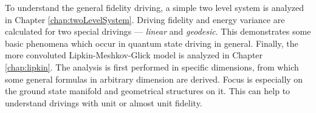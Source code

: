 To understand the general fidelity driving, a simple two level system is analyzed in Chapter \ref{chap:twoLevelSystem}. Driving fidelity and energy variance are calculated for two special drivings — \emph{linear} and \emph{geodesic}. This demonstrates some basic phenomena which occur in quantum state driving in general. Finally, the more convoluted Lipkin-Meshkov-Glick model is analyzed in Chapter \ref{chap:lipkin}. The analysis is first performed in specific dimensions, from which some general formulas in arbitrary dimension are derived. Focus is especially on the ground state manifold and geometrical structures on it. This can help to understand drivings with unit or almost unit fidelity.